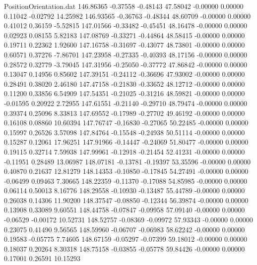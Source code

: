 \begin{filecontents}{PositionOrientation.dat}
 146.86365   -0.37558   -0.48143    47.58042   -0.00000    0.00000    0.11042   -0.02792   14.25982
 146.93565   -0.36763   -0.48344    48.60709   -0.00000    0.00000    0.41012    0.36159   -5.52815
 147.01566   -0.33482   -0.45451    48.16478   -0.00000    0.00000    0.02923    0.08155    5.82183
 147.08769   -0.33271   -0.44864    48.58415   -0.00000    0.00000    0.19711    0.22362    1.92600
 147.16758   -0.31697   -0.43077    48.73801   -0.00000    0.00000    0.60571    0.37276   -7.86701
 147.23958   -0.27335   -0.40393    48.17156   -0.00000    0.00000    0.28572    0.32779   -3.79045
 147.31956   -0.25050   -0.37772    47.86842   -0.00000    0.00000    0.13047    0.14956    0.85602
 147.39151   -0.24112   -0.36696    47.93002   -0.00000    0.00000    0.28491    0.38020    2.46180
 147.47158   -0.21830   -0.33652    48.12712   -0.00000    0.00000    0.11200    0.33856    6.54909
 147.54351   -0.21025   -0.31216    48.59821   -0.00000    0.00000   -0.01595    0.20922    2.72955
 147.61551   -0.21140   -0.29710    48.79474   -0.00000    0.00000    0.39374    0.25096    8.33813
 147.69552   -0.17989   -0.27702    49.46192   -0.00000    0.00000    0.16108    0.08860   10.60394
 147.76747   -0.16830   -0.27065    50.22485   -0.00000    0.00000    0.15997    0.26526    3.57098
 147.84764   -0.15548   -0.24938    50.51114   -0.00000    0.00000    0.15287    0.12061   17.96251
 147.91966   -0.14447   -0.24069    51.80477   -0.00000    0.00000    0.19115    0.32714    7.59938
 147.99961   -0.12918   -0.21454    52.41231   -0.00000    0.00000   -0.11951    0.28489   13.06987
 148.07181   -0.13781   -0.19397    53.35596   -0.00000    0.00000    0.40870    0.21637   12.81279
 148.14353   -0.10850   -0.17845    54.27491   -0.00000    0.00000   -0.06499    0.09463    7.30665
 148.22359   -0.11370   -0.17088    54.85985   -0.00000    0.00000    0.06114    0.50013    8.16776
 148.29558   -0.10930   -0.13487    55.44789   -0.00000    0.00000    0.26038    0.14306   11.90200
 148.37547   -0.08850   -0.12344    56.39874   -0.00000    0.00000    0.13908    0.33089    9.60551
 148.44758   -0.07847   -0.09958    57.09140   -0.00000    0.00000   -0.06529   -0.00172   10.52731
 148.52757   -0.08369   -0.09972    57.93343   -0.00000    0.00000    0.23075    0.41490    9.56565
 148.59960   -0.06707   -0.06983    58.62242   -0.00000    0.00000    0.19583   -0.05775    7.74605
 148.67159   -0.05297   -0.07399    59.18012   -0.00000    0.00000    0.18037    0.20264    8.30318
 148.75158   -0.03855   -0.05778    59.84426   -0.00000    0.00000    0.17001    0.26591   10.15293

\end{filecontents}
